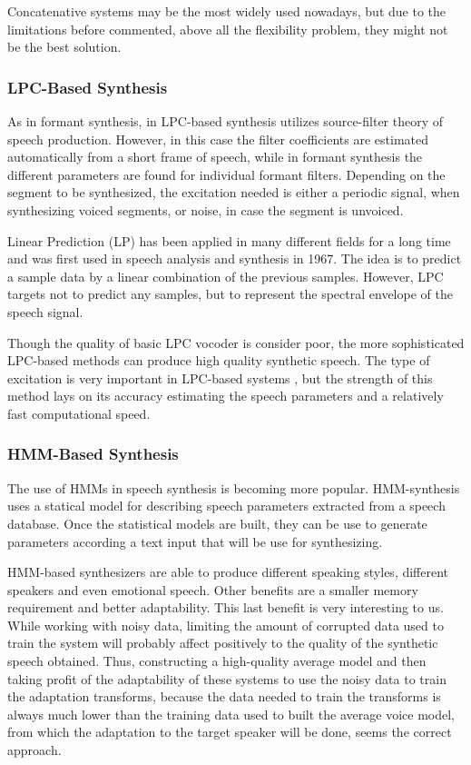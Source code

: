 Concatenative systems may be the most widely used nowadays, but due to the limitations before commented, above all the flexibility problem, they might not be the best solution.

\subsubsection{LPC-Based Synthesis}
\label{lpc_based_speech_synthesis}
As in formant synthesis, in LPC-based synthesis utilizes source-filter theory of speech production. However, in this case the filter coefficients are estimated automatically from a short frame of speech, while in formant synthesis the different parameters are found for individual formant filters. Depending on the segment to be synthesized, the excitation needed is either a periodic signal, when synthesizing voiced segments, or noise, in case the segment is unvoiced. 

Linear Prediction (LP) has been applied in many different fields for a long time and was first used in speech analysis and synthesis in 1967. The idea is to predict a sample data by a linear combination of the previous samples. However, LPC targets not to predict any samples, but to represent the spectral envelope of the speech signal. 

Though the quality of basic LPC vocoder is consider poor, the more sophisticated LPC-based methods can produce high quality synthetic speech. The type of excitation is very important in LPC-based systems \cite{TuomoMSc}, but the strength of this method lays on its accuracy estimating the speech parameters and a relatively fast computational speed.

\subsubsection{HMM-Based Synthesis}
\label{hmm_based_speech_synthesis}
The use of HMMs in speech synthesis is becoming more popular. HMM-synthesis uses a statical model for describing speech parameters extracted from a speech database. Once the statistical models are built, they can be use to generate parameters according a text input that will be use for synthesizing. 

HMM-based synthesizers are able to produce different speaking styles, different speakers and even emotional speech. Other benefits are a smaller memory requirement and better adaptability. This last benefit is very interesting to us. While working with noisy data, limiting the amount of corrupted data used to train the system will probably affect positively to the quality of the synthetic speech obtained. Thus, constructing a high-quality average model and then taking profit of the adaptability of these systems to use the noisy data to train the adaptation transforms, because the data needed to train the transforms is always much lower than the training data used to built the average voice model, from which the adaptation to the target speaker will be done, seems the correct approach.

